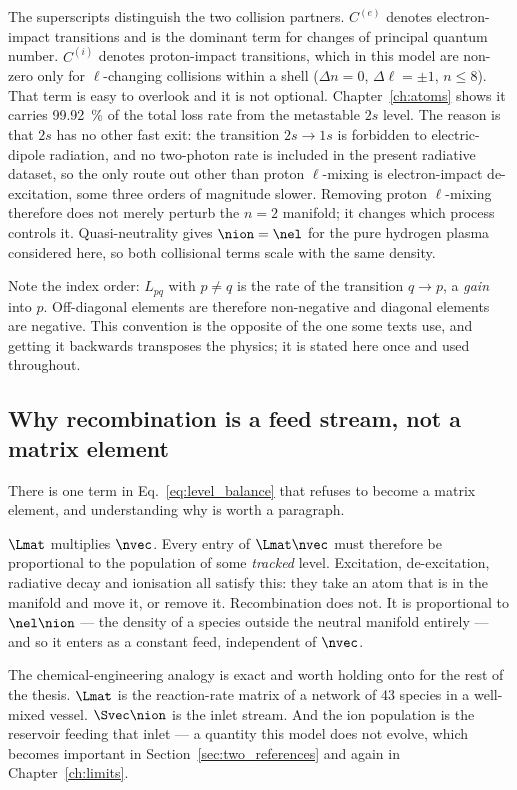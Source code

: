 The superscripts distinguish the two collision partners. $C^{(e)}$ denotes
electron-impact transitions and is the dominant term for changes of principal
quantum number. $C^{(i)}$ denotes proton-impact transitions, which in this model
are non-zero only for $\ell$-changing collisions within a shell
($\Delta n = 0$, $\Delta\ell = \pm1$, $n \le 8$). That term is easy to overlook
and it is not optional. Chapter~\ref{ch:atoms} shows it carries
\SI{99.92}{\percent} of the total loss rate from the metastable $2s$ level.
The reason is that $2s$ has no other fast exit: the transition $2s \to 1s$ is
forbidden to electric-dipole radiation, and no two-photon rate is included in
the present radiative dataset, so the only route out other than proton
$\ell$-mixing is electron-impact de-excitation, some three orders of magnitude
slower. Removing proton $\ell$-mixing therefore does not merely perturb the
$n=2$ manifold; it changes which process controls it. Quasi-neutrality gives
$\nion = \nel$ for the pure hydrogen plasma considered here, so both collisional
terms scale with the same density.

\noindent Note the index order: $L_{pq}$ with $p \neq q$ is the rate of the
transition $q \to p$, a \emph{gain} into $p$. Off-diagonal elements are
therefore non-negative and diagonal elements are negative. This convention is
the opposite of the one some texts use, and getting it backwards transposes the
physics; it is stated here once and used throughout.

\subsection{Why recombination is a feed stream, not a matrix element}

There is one term in Eq.~\eqref{eq:level_balance} that refuses to become a
matrix element, and understanding why is worth a paragraph.

$\Lmat$ multiplies $\nvec$. Every entry of $\Lmat\nvec$ must therefore be
proportional to the population of some \emph{tracked} level. Excitation,
de-excitation, radiative decay and ionisation all satisfy this: they take an
atom that is in the manifold and move it, or remove it. Recombination does
not. It is proportional to $\nel\nion$ --- the density of a species outside the
neutral manifold entirely --- and so it enters as a constant feed, independent of
$\nvec$.

The chemical-engineering analogy is exact and worth holding onto for the rest of
the thesis. $\Lmat$ is the reaction-rate matrix of a network of 43 species in a
well-mixed vessel. $\Svec\nion$ is the inlet stream. And the ion population is
the reservoir feeding that inlet --- a quantity this model does not evolve, which
becomes important in Section~\ref{sec:two_references} and again in
Chapter~\ref{ch:limits}.

